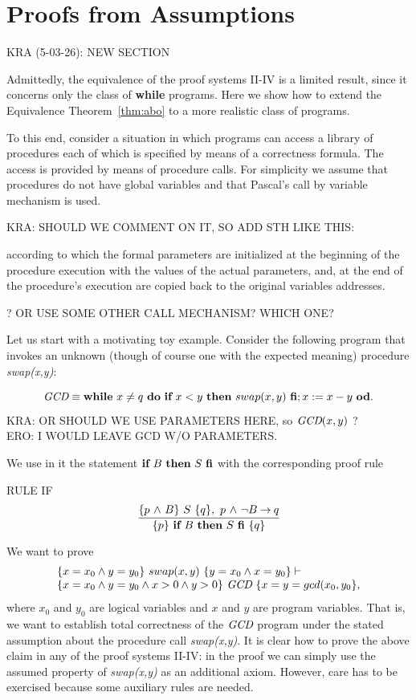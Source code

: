 \documentclass[runningheads]{llncs}       %
\begin{document}
\section{Proofs from Assumptions}

KRA (5-03-26): NEW SECTION
\III

Admittedly, the equivalence of the proof systems II-IV is a limited
result, since it concerns only the class of \textbf{while}
programs. Here we show how to extend the Equivalence
Theorem~\ref{thm:abo} to a more realistic class of programs.

To this end, consider a situation in which programs can access a library of
procedures each of which is specified by means of a correctness
formula. The access is provided by means of procedure calls.  For
simplicity we assume that procedures do not have global variables and
that Pascal's call by variable mechanism is used.

KRA: SHOULD WE COMMENT ON IT, SO ADD STH LIKE THIS: 

\NI
according to which the formal parameters are initialized at the
beginning of the procedure execution with the values of the actual
parameters, and, at the end of the  procedure's execution are
copied back to the original variables addresses.

\NI ? OR USE SOME OTHER CALL MECHANISM? WHICH ONE?

Let us start with a motivating toy example. Consider the following program
that invokes an unknown (though of course one with the expected meaning)
procedure \emph{swap(x,y)}:

\[
\mbox{{\it GCD}} \equiv \mbox{$\mbox{{\bf while}\ } {x \neq q}\ \mbox{{\bf do}\ } {\mbox{$\mbox{{\bf if}\ } {x < y} \mbox{\ {\bf then}\ } {swap(x,y)}\ \mbox{{\bf fi}}$}; x:= x-y}\ \mbox{{\bf od}}$}.
\]
KRA: OR SHOULD WE USE PARAMETERS HERE, so $\mbox{{\it GCD}}(x,y)$ ? \\
ERO: I WOULD LEAVE GCD W/O PARAMETERS.

We use in it the statement $\mbox{$\mbox{{\bf if}\ } {B} \mbox{\ {\bf then}\ } {S}\ \mbox{{\bf fi}}$}$ 
with the corresponding proof rule
\III

\NI
RULE IF
  \[ \frac{ \mbox{$\{{p \mbox{$\ \wedge\ $} B}\}\ {S}\ \{{q}\}$}, \ p \mbox{$\ \wedge\ $} \neg B \mbox{$\:\rightarrow\:$} q}
  { \mbox{$\{{p}\}\ {\mbox{$\mbox{{\bf if}\ } {B} \mbox{\ {\bf then}\ } {S}\ \mbox{{\bf fi}}$}}\ \{{q}\}$}}
  \]
\III
  
We want to prove 
\begin{equation}
 \begin{array}{l}  
\mbox{$\{{x=x_0 \wedge y=y_0}\}\ {swap(x,y)}\ \{{y=x_0 \wedge x=y_0}\}$} \vdash  \\
   \mbox{$\{{x=x_0 \wedge y=y_0 \wedge x>0 \wedge y>0}\}\ {\mbox{{\it GCD}}}\ \{{x=y=gcd(x_0, y_0}\}$},
 \end{array}
 \label{equ:gcd}
\end{equation}
where $x_0$ and $y_0$ are logical variables and $x$ and $y$ are
program variables.  That is, we want to establish total correctness of
the $\mbox{{\it GCD}}$ program under the stated assumption about the procedure
call \emph{swap(x,y)}.  It is clear how to prove the above claim in
any of the proof systems II-IV: in the proof we can simply use the
assumed property of \emph{swap(x,y)} as an additional axiom. However,
care has to be exercised because some auxiliary rules are needed.
\end{document}
